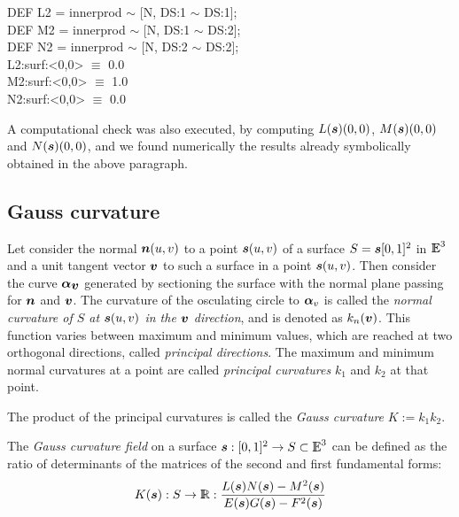 \documentclass{31x47jw}
\begin{document}
\begin{script}
\begin{smallplasm}
DEF L2 = innerprod $\sim$ [N, DS:1  $\sim$  DS:1];\\
DEF M2 = innerprod $\sim$ [N, DS:1  $\sim$  DS:2];\\
DEF N2 = innerprod $\sim$ [N, DS:2  $\sim$  DS:2];\\[0.3cm]

L2:surf:<0,0> $\equiv$ 0.0\\
M2:surf:<0,0> $\equiv$ 1.0\\
N2:surf:<0,0> $\equiv$ 0.0
\end{smallplasm}
\label{script:5:form2}
\end{script}
A computational check was also executed, by computing 
$L({\mbox{\boldmath $s$}}) (0,0)$, $M({\mbox{\boldmath $s$}}) (0,0)$ and $N({\mbox{\boldmath $s$}}) (0,0)$, and we found 
numerically the results  already symbolically obtained in the above 
paragraph.



\subsection{Gauss curvature}

Let consider the normal ${\mbox{\boldmath $n$}}(u,v)$ to a point ${\mbox{\boldmath $s$}}(u,v)$ of a
surface $S = {\mbox{\boldmath $s$}}[0,1]^{2}$ in $\mathbb{I\!\!E}^{3}$ and a unit tangent vector
${\mbox{\boldmath $v$}}$ to such a surface in a point ${\mbox{\boldmath $s$}}(u,v)$.  Then consider the
curve ${\mbox{\boldmath $\alpha$}}_{{\mbox{\boldmath $v$}}}$ generated by sectioning the surface with
the normal plane passing for ${\mbox{\boldmath $n$}}$ and ${\mbox{\boldmath $v$}}$.  The curvature of
the osculating circle to ${\mbox{\boldmath $\alpha$}}_{v}$ is called the \emph{normal
curvature of $S$ at ${\mbox{\boldmath $s$}}(u,v)$ in the ${\mbox{\boldmath $v$}}$ direction}, and is
denoted as $k_{n}({\mbox{\boldmath $v$}})$.  This function varies between maximum
and minimum values, which are reached at two orthogonal directions,
called \emph{principal directions}.  The maximum and minimum normal
curvatures at a point are called \emph{principal curvatures} $k_{1}$
and $k_{2}$ at that point.

The product of the principal curvatures is called the \emph{Gauss 
curvature} $K := k_{1}k_{2}$.

The  \emph{Gauss curvature field} on a surface ${\mbox{\boldmath $s$}}:[0,1]^{2}\rightarrow
S\subset\mathbb{I\!\!E}^{3}$ can be defined as the ratio of determinants of the
matrices of the second and first fundamental forms:
\[
K({\mbox{\boldmath $s$}}) : S \rightarrow\mathbb{I\!\!R} : {L({\mbox{\boldmath $s$}})N({\mbox{\boldmath $s$}}) - M^{2}({\mbox{\boldmath $s$}}) 
\over E({\mbox{\boldmath $s$}})G({\mbox{\boldmath $s$}}) - F^{2}({\mbox{\boldmath $s$}})}
\]
\end{document}
